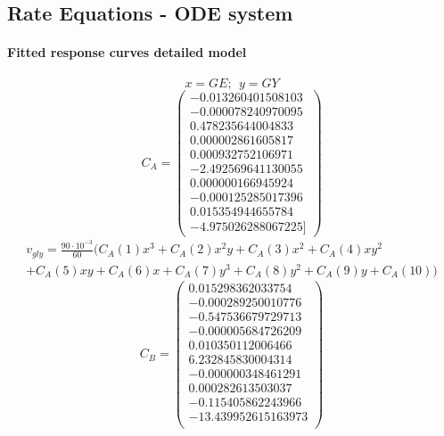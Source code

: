 \newpage
\begin{landscape}
\begin{multicols}{2}

\section{Rate Equations - ODE system}
\label{sec: rate_equations}
\footnotesize

\paragraph{Fitted response curves detailed model}

\begin{equation*}
x = GE;~~y = GY
\end{equation*}
\begin{equation*}
C_A = \left( \begin{array}{c}
-0.013260401508103\\
-0.000078240970095\\
   0.478235644004833\\ 
   0.000002861605817\\
   0.000932752106971\\
  -2.492569641130055\\
   0.000000166945924\\
  -0.000125285017396\\
   0.015354944655784\\
   -4.975026288067225]
\end{array} \right)
\end{equation*}
\begin{multline}
v_{gly} = \frac{90\cdot10^{-3}}{60} ( C_A(1)x^3 + C_A(2)x^2y + C_A(3)x^2 + C_A(4)xy^2 \\
		+ C_A(5)xy +C_A(6)x + C_A(7)y^3 + C_A(8)y^2 + C_A(9)y + C_A(10))
\end{multline}
\begin{equation*}
C_B = \left( \begin{array}{c}         
0.015298362033754\\
-0.000289250010776\\
-0.547536679729713\\
-0.000005684726209\\
0.010350112006466\\
6.232845830004314\\
-0.000000348461291\\
0.000282613503037\\
-0.115405862243966\\
-13.439952615163973\\
\end{array} \right)
\end{equation*}


\end{multicols}
\end{landscape}
